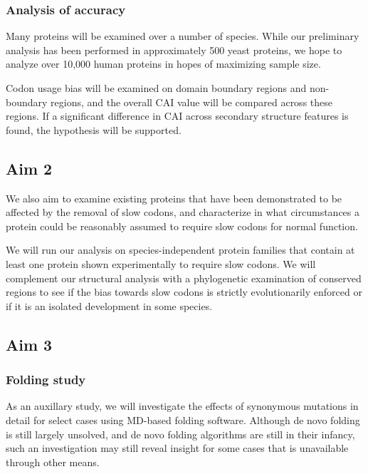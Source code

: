 \documentclass[11pt]{nih}
\newcommand{\todo}[1]{
\addcontentsline{tdo}{todo}{\protect{#1}}
\textcolor{red}{TODO: #1}
}
\begin{document}





\subsubsection{Analysis of accuracy}
Many proteins will be examined over a number of species. While our preliminary analysis has been performed in approximately 500 yeast proteins, we hope to analyze over 10,000 human proteins in hopes of maximizing sample size.

Codon usage bias will be examined on domain boundary regions and non-boundary regions, and the overall CAI value will be compared across these regions. If a significant difference in CAI across secondary structure features is found, the hypothesis will be supported.
\cite{Liu:2011p8245}


\subsection{Aim 2}
We also aim to examine existing proteins that have been demonstrated to be affected by the removal of slow codons, and characterize in what circumstances a protein could be reasonably assumed to require slow codons for normal function.

We will run our analysis on species-independent protein families that contain at least one protein shown experimentally to require slow codons. We will complement our structural analysis with a phylogenetic examination of conserved regions to see if the bias towards slow codons is strictly evolutionarily enforced or if it is an isolated development in some species.
\subsection{Aim 3}

\subsubsection{Folding study}
As an auxillary study, we will investigate the effects of synonymous mutations in detail for select cases using MD-based folding software. Although de novo folding is still largely unsolved, and de novo folding algorithms are still in their infancy, such an investigation may still reveal insight for some cases that is unavailable through other means. \cite{Zhang:2008p3335}  




 

\appendix
\end{document}
